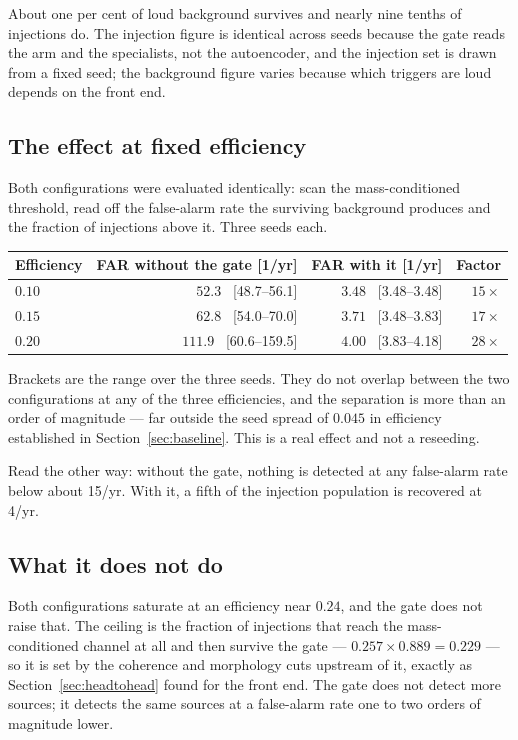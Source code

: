 \documentclass[11pt]{article}
\begin{document}
About one per cent of loud background survives and nearly nine tenths of injections do.
The injection figure is identical across seeds because the gate reads the arm and the
specialists, not the autoencoder, and the injection set is drawn from a fixed seed; the
background figure varies because which triggers are loud depends on the front end.

\subsection*{The effect at fixed efficiency}

Both configurations were evaluated identically: scan the mass-conditioned threshold, read
off the false-alarm rate the surviving background produces and the fraction of injections
above it. Three seeds each.

\begin{center}
\begin{tabular}{lrrr}
\toprule
Efficiency & FAR without the gate [1/yr] & FAR with it [1/yr] & Factor \\
\midrule
$0.10$ & $52.3$ \ [48.7--56.1]  & $3.48$ \ [3.48--3.48] & $15\times$ \\
$0.15$ & $62.8$ \ [54.0--70.0]  & $3.71$ \ [3.48--3.83] & $17\times$ \\
$0.20$ & $111.9$ \ [60.6--159.5] & $4.00$ \ [3.83--4.18] & $28\times$ \\
\bottomrule
\end{tabular}
\end{center}

Brackets are the range over the three seeds. They do not overlap between the two
configurations at any of the three efficiencies, and the separation is more than an order
of magnitude --- far outside the seed spread of $0.045$ in efficiency established in
Section~\ref{sec:baseline}. This is a real effect and not a reseeding.

Read the other way: without the gate, nothing is detected at any false-alarm rate below
about 15/yr. With it, a fifth of the injection population is recovered at 4/yr.

\subsection*{What it does not do}

Both configurations saturate at an efficiency near $0.24$, and the gate does not raise
that. The ceiling is the fraction of injections that reach the mass-conditioned channel
at all and then survive the gate --- $0.257 \times 0.889 = 0.229$ --- so it is set by the
coherence and morphology cuts upstream of it, exactly as Section~\ref{sec:headtohead}
found for the front end. The gate does not detect more sources; it detects the same
sources at a false-alarm rate one to two orders of magnitude lower.
\end{document}
